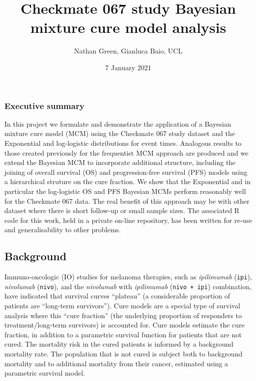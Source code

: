 \documentclass[
]{article}
\title{Checkmate 067 study Bayesian mixture cure model analysis}
\author{Nathan Green, Gianluca Baio, UCL}
\date{7 January 2021}
\begin{document}
\maketitle

\hypertarget{executive-summary}{%
\subsubsection{Executive summary}\label{executive-summary}}

In this project we formulate and demonstrate the application of a
Bayesian mixture cure model (MCM) using the Checkmate 067 study dataset
and the Exponential and log-logistic distributions for event times.
Analogous results to those created previously for the frequentist MCM
approach are produced and we extend the Bayesian MCM to incorporate
additional structure, including the joining of overall survival (OS) and
progression-free survival (PFS) models using a hierarchical struture on
the cure fraction. We show that the Exponential and in particular the
log-logistic OS and PFS Bayesian MCMs perform reasonably well for the
Checkmate 067 data. The real benefit of this approach may be with other
dataset where there is short follow-up or small sample sizes. The
associated R code for this work, held in a private on-line repository,
has been written for re-use and generalisability to other problems.

\hypertarget{background}{%
\subsection{Background}\label{background}}

Immuno-oncologic (IO) studies for melanoma therapies, such as
\emph{ipilimumab} (\texttt{ipi}), \emph{nivolumab} (\texttt{nivo}), and
the \emph{nivolumab} with \emph{ipilimumab} (\texttt{nivo\ +\ ipi})
combination, have indicated that survival curves ``plateau'' (a
considerable proportion of patients are ``long-term survivors''). Cure
models are a special type of survival analysis where this ``cure
fraction'' (the underlying proportion of responders to
treatment/long-term survivors) is accounted for. Cure models estimate
the cure fraction, in addition to a parametric survival function for
patients that are not cured. The mortality risk in the cured patients is
informed by a background mortality rate. The population that is not
cured is subject both to background mortality and to additional
mortality from their cancer, estimated using a parametric survival
model.
\end{document}
